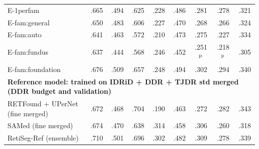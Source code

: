 {\begin{longtable}{l c c c c c c c c }
E-1perfam & .665 & .494 & .625 & .228 & .486 & .281 & .278 & .321 \\
E-fam:general & .650 & .483 & .606 & .227 & .470 & .268 & .266 & .324 \\
E-fam:auto & .641 & .463 & .572 & .210 & .473 & .275 & .227 & .334 \\
E-fam:fundus & .637 & .444 & .568 & .246 & .452 & .251$^{\rm p}$ & .218$^{\rm p}$ & .305 \\
E-fam:foundation & .676 & .509 & .657 & .248 & .494 & .302 & .294 & .340 \\
\multicolumn{9}{l}{\textbf{Reference model: trained on IDRiD + DDR + TJDR std merged (DDR budget and validation)}}\\
RETFound + UPerNet (fine merged) & .672 & .468 & .704 & .190 & .463 & .272 & .282 & .343 \\
SAMed (fine merged) & .674 & .470 & .638 & .314 & .458 & .306 & .260 & .318 \\
RetiSeg-Ref (ensemble) & .710 & .501 & .696 & .302 & .482 & .309 & .278 & .339 \\
\end{longtable}
}
\vspace{-6pt}
